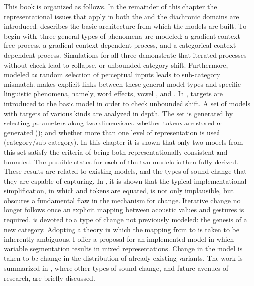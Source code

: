 This book is organized as follows. In the remainder of this chapter\largerpage
the representational issues that apply in both the  and
the diachronic domains are introduced. 
describes the basic architecture from which the models are built.
To begin with, three general types of phenomena are modeled: a gradient
context-free process, a gradient context-dependent process, and a
categorical context-dependent process. Simulations for all three demonstrate
that iterated processes without check lead to collapse, or unbounded
category shift. Furthermore,  modeled as random selection
of  perceptual inputs leads to sub-category mismatch.
 makes explicit links
between these general model types and specific linguistic phenomena,
namely, word  effects, vowel , and .
In ,  targets are introduced
to the basic model in order to check unbounded shift. A set of models
with targets of various kinds are analyzed in depth. The set is generated
by selecting parameters along two dimensions: whether  tokens
are stored or generated (); and whether more than
one level of representation is used (category/sub-category). In this
chapter it is shown that only two models from this set satisfy the
criteria of being both representationally consistent and bounded.
The possible states for each of the two models is then fully derived.
These results are related to existing models, and the types of sound
change that they are capable of capturing. In , 
it is shown that the typical implementational simplification, in which
 and  tokens are equated, is not only implausible,
but obscures a fundamental flaw in the mechanism for change. Iterative
change no longer follows once an explicit mapping between acoustic
values and  gestures is required. 
is devoted to a type of change not previously modeled: the genesis
of a new  category. Adopting a theory in which the mapping
from  to  is taken to be inherently ambiguous,
I offer a proposal for an implemented model in which variable 
segmentation results in mixed representations. Change in the model
is taken to be change in the distribution of already existing variants.
The work is summarized in ,
where other types of sound change, and future avenues of research,
are briefly discussed. 

